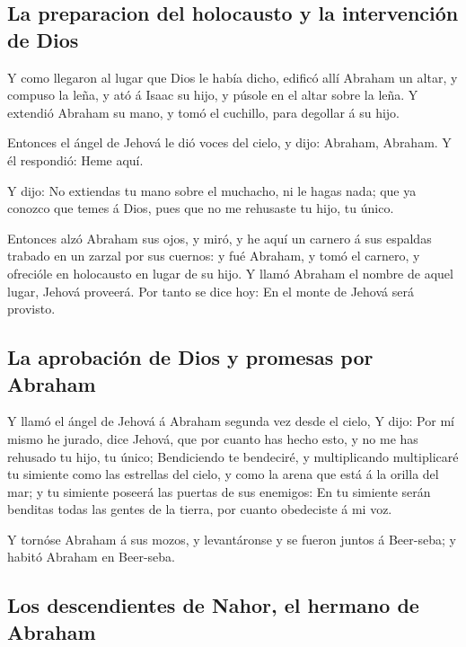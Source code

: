 \hypertarget{la-preparacion-del-holocausto-y-la-intervenciuxf3n-de-dios}{%
\subsection{La preparacion del holocausto y la intervención de
Dios}\label{la-preparacion-del-holocausto-y-la-intervenciuxf3n-de-dios}}

 Y como llegaron al lugar que Dios le había dicho, edificó
allí Abraham un altar, y compuso la leña, y ató á Isaac su hijo, y
púsole en el altar sobre la leña.  Y extendió Abraham su
mano, y tomó el cuchillo, para degollar á su hijo.

 Entonces el ángel de Jehová le dió voces del cielo, y
dijo: Abraham, Abraham. Y él respondió: Heme aquí.

 Y dijo: No extiendas tu mano sobre el muchacho, ni le
hagas nada; que ya conozco que temes á Dios, pues que no me rehusaste tu
hijo, tu único.

 Entonces alzó Abraham sus ojos, y miró, y he aquí un
carnero á sus espaldas trabado en un zarzal por sus cuernos: y fué
Abraham, y tomó el carnero, y ofrecióle en holocausto en lugar de su
hijo.  Y llamó Abraham el nombre de aquel lugar, Jehová
proveerá. Por tanto se dice hoy: En el monte de Jehová será provisto.

\hypertarget{la-aprobaciuxf3n-de-dios-y-promesas-por-abraham}{%
\subsection{La aprobación de Dios y promesas por
Abraham}\label{la-aprobaciuxf3n-de-dios-y-promesas-por-abraham}}

 Y llamó el ángel de Jehová á Abraham segunda vez desde el
cielo,  Y dijo: Por mí mismo he jurado, dice Jehová, que
por cuanto has hecho esto, y no me has rehusado tu hijo, tu único;
 Bendiciendo te bendeciré, y multiplicando multiplicaré tu
simiente como las estrellas del cielo, y como la arena que está á la
orilla del mar; y tu simiente poseerá las puertas de sus enemigos:
 En tu simiente serán benditas todas las gentes de la
tierra, por cuanto obedeciste á mi voz.

 Y tornóse Abraham á sus mozos, y levantáronse y se fueron
juntos á Beer-seba; y habitó Abraham en Beer-seba.

\hypertarget{los-descendientes-de-nahor-el-hermano-de-abraham}{%
\subsection{Los descendientes de Nahor, el hermano de
Abraham}\label{los-descendientes-de-nahor-el-hermano-de-abraham}}

